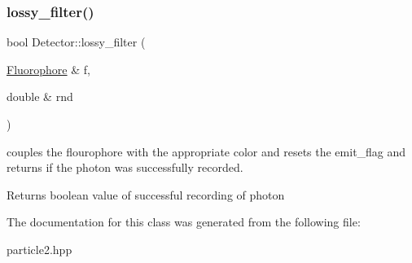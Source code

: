 \subsubsection{\texorpdfstring{lossy\+\_\+filter()}{lossy\_filter()}}
{\footnotesize\ttfamily bool Detector\+::lossy\+\_\+filter (\begin{DoxyParamCaption}\item[{\hyperlink{classFluorophore}{Fluorophore} \&}]{f,  }\item[{double \&}]{rnd }\end{DoxyParamCaption})\hspace{0.3cm}{\ttfamily [inline]}}



couples the flourophore with the appropriate color and resets the emit\+\_\+flag and returns if the photon was successfully recorded. 

\begin{DoxyReturn}{Returns}
boolean value of successful recording of photon 
\end{DoxyReturn}


The documentation for this class was generated from the following file\+:\begin{DoxyCompactItemize}
\item 
particle2.\+hpp\end{DoxyCompactItemize}
